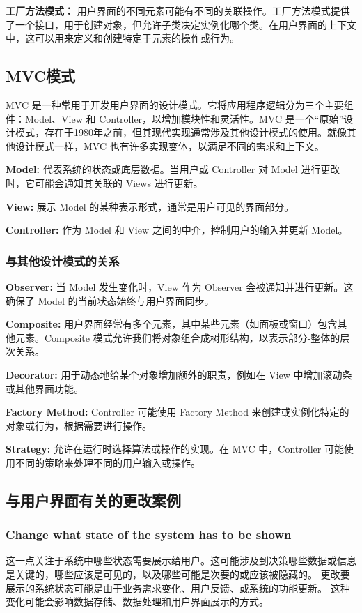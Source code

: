 \textbf{工厂方法模式：}
用户界面的不同元素可能有不同的关联操作。工厂方法模式提供了一个接口，用于创建对象，但允许子类决定实例化哪个类。在用户界面的上下文中，这可以用来定义和创建特定于元素的操作或行为。

\subsection{MVC模式}

MVC 是一种常用于开发用户界面的设计模式。它将应用程序逻辑分为三个主要组件：Model、View 和 Controller，以增加模块性和灵活性。MVC 是一个“原始”设计模式，存在于1980年之前，但其现代实现通常涉及其他设计模式的使用。就像其他设计模式一样，MVC 也有许多实现变体，以满足不同的需求和上下文。

\textbf{Model: }代表系统的状态或底层数据。当用户或 Controller 对 Model 进行更改时，它可能会通知其关联的 Views 进行更新。

\textbf{View: }展示 Model 的某种表示形式，通常是用户可见的界面部分。

\textbf{Controller: }作为 Model 和 View 之间的中介，控制用户的输入并更新 Model。

\subsubsection{与其他设计模式的关系}

\textbf{Observer: }当 Model 发生变化时，View 作为 Observer 会被通知并进行更新。这确保了 Model 的当前状态始终与用户界面同步。

\textbf{Composite: }用户界面经常有多个元素，其中某些元素（如面板或窗口）包含其他元素。Composite 模式允许我们将对象组合成树形结构，以表示部分-整体的层次关系。

\textbf{Decorator: }用于动态地给某个对象增加额外的职责，例如在 View 中增加滚动条或其他界面功能。

\textbf{Factory Method: }Controller 可能使用 Factory Method 来创建或实例化特定的对象或行为，根据需要进行操作。

\textbf{Strategy: }允许在运行时选择算法或操作的实现。在 MVC 中，Controller 可能使用不同的策略来处理不同的用户输入或操作。

\subsection{与用户界面有关的更改案例}

\subsubsection{Change what state of the system has to be shown}
这一点关注于系统中哪些状态需要展示给用户。这可能涉及到决策哪些数据或信息是关键的，哪些应该是可见的，以及哪些可能是次要的或应该被隐藏的。
更改要展示的系统状态可能是由于业务需求变化、用户反馈、或系统的功能更新。
这种变化可能会影响数据存储、数据处理和用户界面展示的方式。

